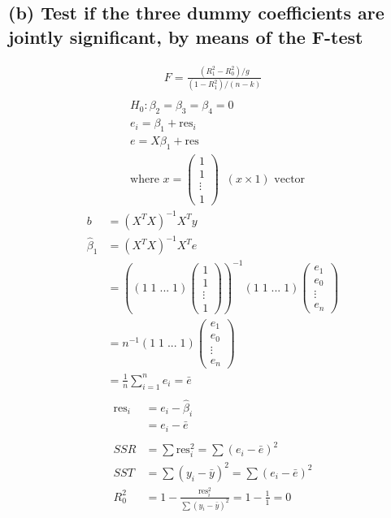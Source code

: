 \documentclass[12pt, a4paper]{article}
\begin{document}
\subsection*{(b) Test if the three dummy coefficients are jointly significant, by means of the F-test}
\begin{align*}
    F = \frac{(R_1^2 - R_0^2)/g}{(1-R^2_1)/(n-k)}\\
\end{align*}
\begin{align*}
    &H_0 : \beta_2 = \beta_3 = \beta_4 = 0\\
    &e_i = \beta_1 + \text{res}_i\\
    &e = X\beta_1 + \text{res}\\
    &\text{where }x = \left(\begin{array}{c}
        1\\
        1\\
        \vdots\\
        1
    \end{array}\right) \;\;(x\times1) \text{ vector}
\end{align*}
\begin{align*}
    b &= (X^TX)^{-1}X^Ty\\
    \hat{\beta}_1 &= (X^TX)^{-1}X^Te\\
    &=\left((1\;1\;...\;1)\left(\begin{array}{c}
        1\\
        1\\
        \vdots\\
        1
    \end{array}\right)\right)^{-1} (1\;1\;...\;1)\left(\begin{array}{c}
        e_1\\
        e_0\\
        \vdots\\
        e_n
    \end{array}\right)\\
    & = n^{-1}(1\;1\;...\;1)\left(\begin{array}{c}
        e_1\\
        e_0\\
        \vdots\\
        e_n
    \end{array}\right)\\
    &=\frac{1}{n}\sum_{i=1}^ne_i = \bar{e}\\
\end{align*}
\begin{align*}
    \text{res}_i &=e_i - \hat{\beta}_i\\
    & = e_i - \bar{e}\\\\
    SSR & = \sum \text{res}_i^2 = \sum (e_i-\bar{e})^2\\
    SST & = \sum (y_i-\bar{y})^2 = \sum (e_i-\bar{e})^2\\
    R_0^2 & = 1 - \frac{\text{res}_i^2}{\sum (y_i-\bar{y})^2} = 1 - \frac{1}{1} = 0
\end{align*}
\end{document}
